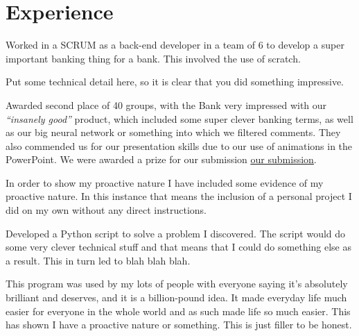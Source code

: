 \section{Experience}

        \vspace{\topsep} %
        \begin{tightitemize}
            \item Worked in a SCRUM as a back-end developer in a team of 6 to develop a super important banking thing for a bank. This involved the use of scratch.
            \item Put some technical detail here, so it is clear that you did something impressive.
            \item Awarded second place of 40 groups, with the Bank very impressed with our \textit{“insanely good”} product, which included some super clever banking terms,
            as well as our big neural network or something into which we filtered comments. They also commended us for our presentation skills due to our use of animations
            in the PowerPoint. We were awarded a prize for our submission \href{https://www.youtube.com/watch?v=dQw4w9WgXcQ}{\underline{our submission}}.
        \end{tightitemize}

    \sectionspace %

        \begin{tightitemize}
            \item In order to show my proactive nature I have included some evidence of my proactive nature. In this instance that means the inclusion of a personal project
            I did on my own without any direct instructions.
            \item Developed a Python script to solve a problem I discovered. The script would do some very clever technical stuff and that means that I could do something
            else as a result. This in turn led to blah blah blah.
            \item This program was used by my lots of people with everyone saying it's absolutely brilliant and deserves, and it is a billion-pound idea. It made everyday
            life much easier for everyone in the whole world and as such made life so much easier. This has shown I have a proactive nature or something. This is just
            filler to be honest.
        \end{tightitemize}

